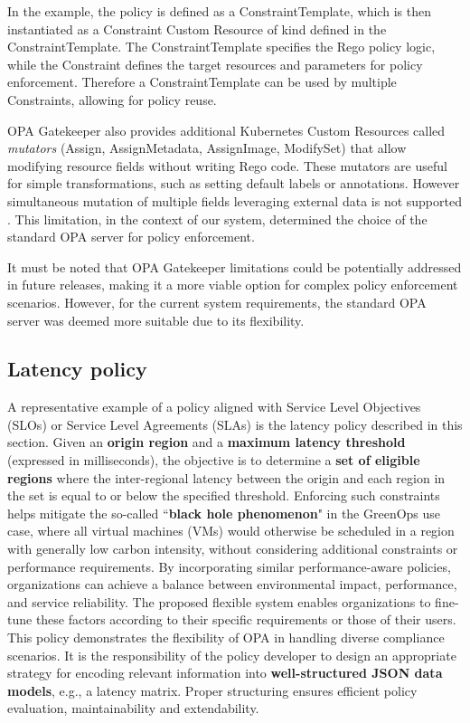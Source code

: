 In the example, the policy is defined as a ConstraintTemplate, which is then instantiated as a Constraint Custom Resource of kind defined in the ConstraintTemplate. The ConstraintTemplate specifies the Rego policy logic, while the Constraint defines the target resources and parameters for policy enforcement. Therefore a ConstraintTemplate can be used by multiple Constraints, allowing for policy reuse.

OPA Gatekeeper also provides additional Kubernetes Custom Resources called \textit{mutators} (Assign, AssignMetadata, AssignImage, ModifySet) that allow modifying resource fields without writing Rego code. These mutators are useful for simple transformations, such as setting default labels or annotations. However simultaneous mutation of multiple fields leveraging external data is not supported \cite{opa_gatekeeper_external_data}. This limitation, in the context of our system, determined the choice of the standard OPA server for policy enforcement.

It must be noted that OPA Gatekeeper limitations could be potentially addressed in future releases, making it a more viable option for complex policy enforcement scenarios. However, for the current system requirements, the standard OPA server was deemed more suitable due to its flexibility.

\subsection{Latency policy}

A representative example of a policy aligned with Service Level Objectives (SLOs) or Service Level Agreements (SLAs) is the latency policy described in this section.
Given an \textbf{origin region} and a \textbf{maximum latency threshold} (expressed in milliseconds), the objective is to determine a \textbf{set of eligible regions} where the inter-regional latency between the origin and each region in the set is equal to or below the specified threshold.
Enforcing such constraints helps mitigate the so-called ``\textbf{black hole phenomenon}" in the GreenOps use case, where all virtual machines (VMs) would otherwise be scheduled in a region with generally low carbon intensity, without considering additional constraints or performance requirements. By incorporating similar performance-aware policies, organizations can achieve a balance between environmental impact, performance, and service reliability.
The proposed flexible system enables organizations to fine-tune these factors according to their specific requirements or those of their users. 
This policy demonstrates the flexibility of OPA in handling diverse compliance scenarios. It is the responsibility of the policy developer to design an appropriate strategy for encoding relevant information into \textbf{well-structured JSON data models}, e.g., a latency matrix. Proper structuring ensures efficient policy evaluation, maintainability and extendability.

